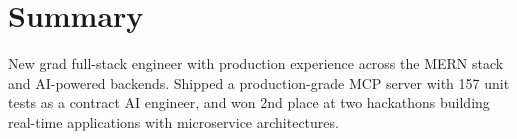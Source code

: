\section{Summary}
\small{
    New grad full-stack engineer with production experience across the MERN stack and AI-powered backends. 
    Shipped a production-grade MCP server with 157 unit tests as a contract AI engineer, and won 2nd place 
    at two hackathons building real-time applications with microservice architectures.
}
